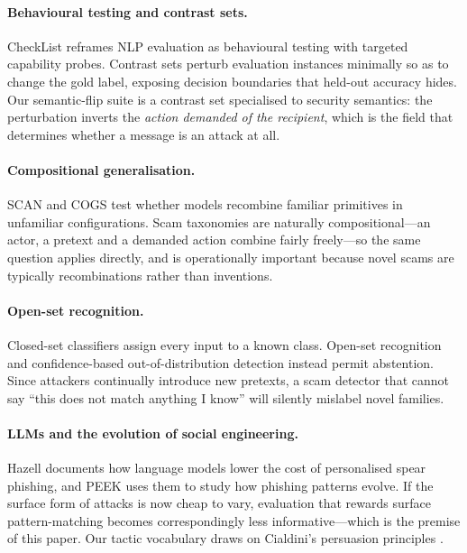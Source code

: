 \documentclass[11pt,a4paper]{article}
\begin{document}
\paragraph{Behavioural testing and contrast sets.}
CheckList \cite{ribeiro2020checklist} reframes NLP evaluation as behavioural
testing with targeted capability probes. Contrast sets \cite{gardner2020contrast}
perturb evaluation instances minimally so as to change the gold label, exposing
decision boundaries that held-out accuracy hides. Our semantic-flip suite is a
contrast set specialised to security semantics: the perturbation inverts the
\emph{action demanded of the recipient}, which is the field that determines
whether a message is an attack at all.

\paragraph{Compositional generalisation.}
SCAN \cite{lake2018scan} and COGS \cite{kim2020cogs} test whether models
recombine familiar primitives in unfamiliar configurations. Scam taxonomies are
naturally compositional---an actor, a pretext and a demanded action combine
fairly freely---so the same question applies directly, and is operationally
important because novel scams are typically recombinations rather than
inventions.

\paragraph{Open-set recognition.}
Closed-set classifiers assign every input to a known class. Open-set recognition
\cite{scheirer2013openset} and confidence-based out-of-distribution detection
\cite{hendrycks2017baseline} instead permit abstention. Since attackers
continually introduce new pretexts, a scam detector that cannot say ``this does
not match anything I know'' will silently mislabel novel families.

\paragraph{LLMs and the evolution of social engineering.}
Hazell \cite{hazell2023spear} documents how language models lower the cost of
personalised spear phishing, and PEEK \cite{peek2024} uses them to study how
phishing patterns evolve. If the surface form of attacks is now cheap to vary,
evaluation that rewards surface pattern-matching becomes correspondingly less
informative---which is the premise of this paper. Our tactic vocabulary draws on
Cialdini's persuasion principles \cite{cialdini2007influence}.
\end{document}
